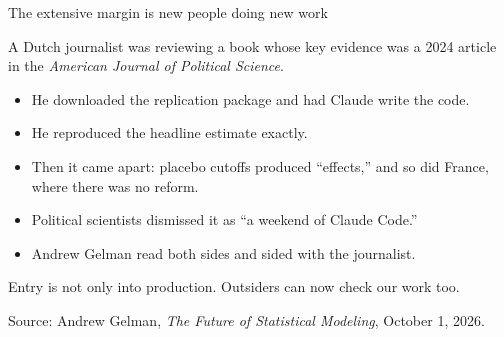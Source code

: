 \documentclass[aspectratio=169,11pt]{beamer}
\begin{document}
\begin{frame}{The extensive margin is new people doing new work}

A Dutch journalist was reviewing a book whose key evidence was a 2024 article in the \emph{American Journal of Political Science}.

\vspace{0.25cm}

\begin{itemize}\setlength\itemsep{0.3em}
    \item He downloaded the replication package and had Claude write the code.
    \item He reproduced the headline estimate exactly.
    \item Then it came apart: placebo cutoffs produced ``effects,'' and so did France, where there was no reform.
    \item Political scientists dismissed it as ``a weekend of Claude Code.''
    \item Andrew Gelman read both sides and sided with the journalist.
\end{itemize}

\vspace{0.3cm}

\alert{Entry is not only into production. Outsiders can now check our work too.}

\vspace{0.1cm}
{\scriptsize\color{warmgray}Source: Andrew Gelman, \emph{The Future of Statistical Modeling}, October 1, 2026.}

\end{frame}
\end{document}
